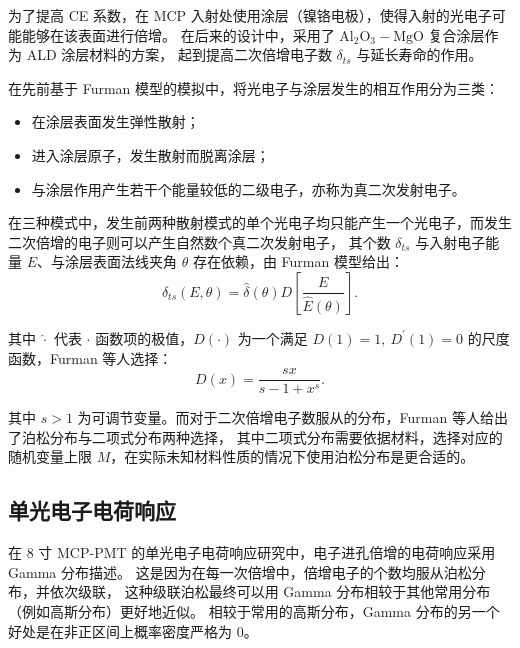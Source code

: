为了提高 CE 系数，在 MCP 入射处使用涂层（镍铬电极），使得入射的光电子可能能够在该表面进行倍增。
在后来的设计中，采用了 $\text{Al}_2\text{O}_3-\text{MgO}$ 复合涂层作为 ALD 涂层材料的方案，
起到提高二次倍增电子数 $\delta_{ts}$ 与延长寿命的作用。

在先前基于 Furman 模型\cite{PhysRevSTAB.5.124404}的模拟\cite{chenOptimizationElectronCollection2016}中，将光电子与涂层发生的相互作用分为三类：
\begin{itemize}
    \item 在涂层表面发生弹性散射；
    \item 进入涂层原子，发生散射而脱离涂层；
    \item 与涂层作用产生若干个能量较低的二级电子，亦称为真二次发射电子。
\end{itemize}

在三种模式中，发生前两种散射模式的单个光电子均只能产生一个光电子，而发生二次倍增的电子则可以产生自然数个真二次发射电子，
其个数 $\delta_{ts}$ 与入射电子能量 $E$、与涂层表面法线夹角 $\theta$ 存在依赖，由 Furman 模型给出：
\begin{equation}
    \delta_{ts}(E,\theta)=\hat{\delta}(\theta)D\left[\frac{E}{\hat{E}(\theta)}\right].
\end{equation}

其中 $\hat{\cdot}$ 代表 $\cdot$ 函数项的极值，$D(\cdot)$ 为一个满足 $D(1)=1,\ D^\prime(1)=0$ 的尺度函数，Furman 等人选择：
\begin{equation}
    D(x)=\frac{sx}{s-1+x^s}.
\end{equation}

其中 $s>1$ 为可调节变量。而对于二次倍增电子数服从的分布，Furman 等人给出了泊松分布与二项式分布两种选择，
其中二项式分布需要依据材料，选择对应的随机变量上限 $M$，在实际未知材料性质的情况下使用泊松分布是更合适的。

\subsection{单光电子电荷响应}\label{sec:spe-charge}

在 8 寸 MCP-PMT 的单光电子电荷响应研究\cite{wengSingleElectronCharge2024}中，电子进孔倍增的电荷响应采用 Gamma 分布描述。
这是因为在每一次倍增中，倍增电子的个数均服从泊松分布，并依次级联，
这种级联泊松最终可以用 Gamma 分布相较于其他常用分布（例如高斯分布）更好地近似。
相较于常用的高斯分布，Gamma 分布的另一个好处是在非正区间上概率密度严格为 0。

